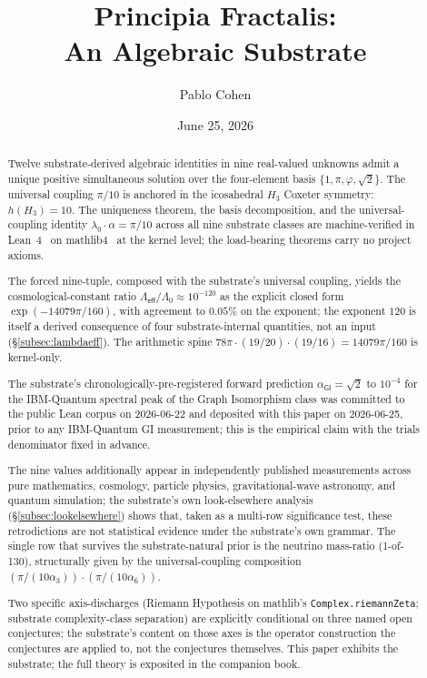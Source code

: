 \documentclass[11pt,a4paper]{amsart}
\title{Principia Fractalis:\\ An Algebraic Substrate}
\author{Pablo Cohen}
\date{June 25, 2026}
\theoremstyle{plain}
\theoremstyle{definition}
\begin{document}
\maketitle

\begin{abstract}
Twelve substrate-derived algebraic identities in nine real-valued unknowns admit a unique positive simultaneous solution over the four-element basis $\{1,\pi,\varphi,\sqrt{2}\}$. The universal coupling $\pi/10$ is anchored in the icosahedral $H_3$ Coxeter symmetry: $h(H_3) = 10$. The uniqueness theorem, the basis decomposition, and the universal-coupling identity $\lambda_0 \cdot \alpha = \pi/10$ across all nine substrate classes are machine-verified in Lean~4~\cite{moura-ullrich2021} on mathlib4~\cite{mathlib4} at the kernel level; the load-bearing theorems carry no project axioms.

The forced nine-tuple, composed with the substrate's universal coupling, yields the cosmological-constant ratio $\Lambda_{\textsf{eff}}/\Lambda_0 \approx 10^{-120}$ as the explicit closed form $\exp(-14079\pi/160)$, with agreement to $0.05\%$ on the exponent; the exponent $120$ is itself a derived consequence of four substrate-internal quantities, not an input (\S\ref{subsec:lambdaeff}). The arithmetic spine $78\pi \cdot (19/20) \cdot (19/16) = 14079\pi/160$ is kernel-only.

The substrate's chronologically-pre-registered forward prediction $\alpha_{\textsf{GI}} = \sqrt{2}$ to $10^{-4}$ for the IBM-Quantum spectral peak of the Graph Isomorphism class was committed to the public Lean corpus on 2026-06-22 and deposited with this paper on 2026-06-25, prior to any IBM-Quantum GI measurement; this is the empirical claim with the trials denominator fixed in advance.

The nine values additionally appear in independently published measurements across pure mathematics, cosmology, particle physics, gravitational-wave astronomy, and quantum simulation; the substrate's own look-elsewhere analysis (\S\ref{subsec:lookelsewhere}) shows that, taken as a multi-row significance test, these retrodictions are not statistical evidence under the substrate's own grammar. The single row that survives the substrate-natural prior is the neutrino mass-ratio (1-of-130), structurally given by the universal-coupling composition $(\pi/(10\alpha_3))\cdot(\pi/(10\alpha_6))$.

Two specific axis-discharges (Riemann Hypothesis on mathlib's \texttt{Complex.riemannZeta}; substrate complexity-class separation) are explicitly conditional on three named open conjectures; the substrate's content on those axes is the operator construction the conjectures are applied to, not the conjectures themselves. This paper exhibits the substrate; the full theory is exposited in the companion book.
\end{abstract}
\end{document}
